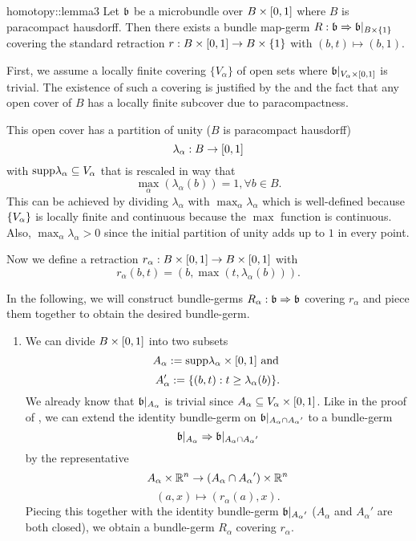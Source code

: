 \begin{scope}
    \newcommand{\A} {
        A_\alpha{}
    }

    \begin{mylemma}{homotopy::lemma3}
        Let $\mathfrak{b}$ be a microbundle over $B \times{} [0, 1]$ where $B$ is paracompact hausdorff.
        Then there exists a bundle map-germ $R: \mathfrak{b} \Rightarrow{} \mathfrak{b}\vert_{B \times{} \{1\}}$
        covering the standard retraction $r: B \times{} [0, 1] \to B \times{} \{1\}$ with $(b, t) \mapsto (b, 1)$.
    \end{mylemma}

    \begin{myproof}
        First, we assume a locally finite covering $\{V_\alpha\}$ of open sets
        where $\mathfrak{b}\vert_{V_\alpha \times{} [0, 1]}$ is trivial.
        The existence of such a covering is justified by the  and
        the fact that any open cover of $B$ has a locally finite subcover due to paracompactness.

        This open cover has a partition of unity ($B$ is paracompact hausdorff) 
        \[ \lambda_\alpha: B \to [0, 1] \]
        with $\text{supp} \lambda_\alpha \subseteq{} V_\alpha$ that is rescaled in way that
        \[ \max_\alpha(\lambda_\alpha(b)) = 1, \forall b \in B. \]
        This can be achieved by dividing $\lambda_\alpha$ with $\max_\alpha \lambda_\alpha$
        which is well-defined because $\{V_\alpha\}$ is locally finite and continuous
        because the $\max$ function is continuous.
        Also, $\max_\alpha \lambda_\alpha > 0$ since the initial
        partition of unity adds up to $1$ in every point.

        Now we define a retraction $r_\alpha: B \times{} [0, 1] \to B \times{} [0, 1]$ with
        \[ r_\alpha(b, t) = (b, \max(t, \lambda_\alpha(b))). \]

        In the following,
        we will construct bundle-germs $R_\alpha: \mathfrak{b} \Rightarrow{} \mathfrak{b}$ covering $r_\alpha$
        and piece them together to obtain the desired bundle-germ.
        \begin{enumerate}
            \item 
            We can divide $B \times [0, 1]$ into two subsets
            \[ A_\alpha := \text{supp}{\lambda_\alpha} \times{} [0, 1] \text{ and } \]
            \[ A'_\alpha := \{(b, t):t \ge \lambda_\alpha(b)\}. \]
            We already know that $\mathfrak{b}\vert_{A_\alpha}$
            is trivial since $A_\alpha \subseteq{} V_\alpha \times{} [0, 1]$.
            Like in the proof of ,
            we can extend the identity bundle-germ on $\bb\restr{\A \cap \A'}$ to a bundle-germ
            \[ \germ{\bb\restr{\A}}{\bb\restr{\A \cap \A'}} \]
            by the representative
            \[ \A \times \R^n \to (\A \cap \A') \times \R^n\]
            \[ (a, x) \mapsto (r_\alpha(a), x). \]
            Piecing this together with the identity
            bundle-germ $\bb\restr{\A'}$ ($\A$ and $\A'$ are both closed),
            we obtain a bundle-germ $R_\alpha$ covering $r_\alpha$.
            

\end{enumerate}
\end{myproof}
\end{scope}
